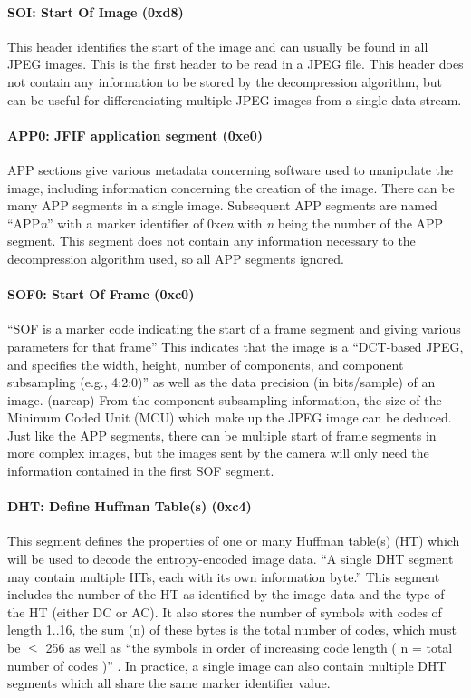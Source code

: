 \paragraph*{SOI: Start Of Image (0xd8)}
This header identifies the start of the image and can usually be found in all JPEG images. 
This is the first header to be read in a JPEG file. 
This header does not contain any information to be stored by the decompression algorithm, but 
can be useful for differenciating multiple JPEG images from a single data stream.

\paragraph*{APP0: JFIF application segment (0xe0)}
APP sections give various metadata concerning software used to manipulate the image, including 
information concerning the creation of the image. 
There can be many APP segments in a single image. 
Subsequent APP segments are named 
``APP\emph{n}'' with a marker identifier of 0xe\emph{n} with \emph{n} being the number of the APP segment. 
This segment does not contain any information necessary to the decompression algorithm used, so all APP segments ignored.

\paragraph*{SOF0: Start Of Frame (0xc0)}
``SOF is a marker code indicating the start of a frame segment and giving various parameters for that frame'' \cite{jpeg_layout} 
This indicates that the image is a ``DCT-based JPEG, and specifies 
the width, height, number of components, and component subsampling (e.g., 4:2:0)'' as well as the data precision (in bits/sample) of an image. 
(narcap) From the component subsampling information, the size of the Minimum Coded Unit (MCU) which make up the JPEG image can be deduced. 
Just like the APP segments, there can be multiple start of frame segments in more complex images, but 
the images sent by the camera will only need the information contained in the first SOF segment.

\paragraph*{DHT: Define Huffman Table(s) (0xc4)}
This segment defines the properties of one or many Huffman table(s) (HT) which will be used to decode the entropy-encoded image data. 
``A single DHT segment may contain multiple HTs, each with its own information byte.'' 
This segment includes the number of the HT as identified by the image data and the type of the HT (either DC or AC). 
It also stores the number of symbols with codes of length 1..16, the sum (n) of these bytes is the total number of codes, 
which must be $\leq$ 256 as well as ``the symbols in order of increasing code length ( n = total number of codes )'' \cite{jpeg_layout} . 
In practice, a single image can also contain multiple DHT segments which all share the same marker identifier value. 

